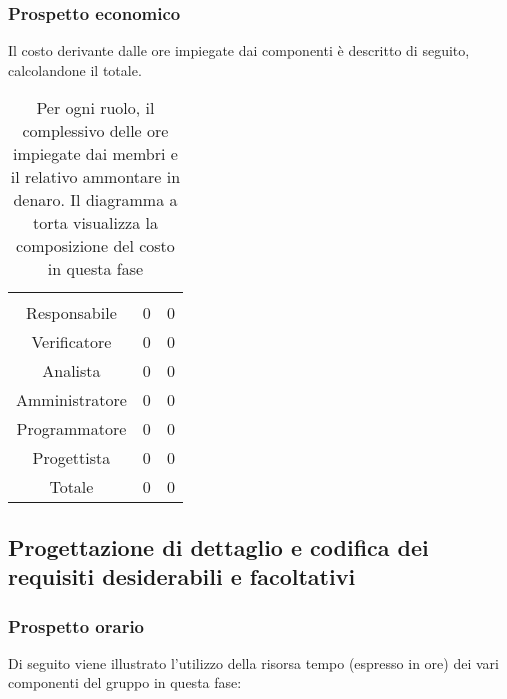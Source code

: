 \subsubsection{Prospetto economico}
Il costo derivante dalle ore impiegate dai componenti è descritto di seguito, calcolandone il totale.

\begin{table}[H]
{\setlength{\parindent}{0cm}
\begin{minipage}{.43\textwidth}
	\begin{tabular}{ccc}
	\rowcolorhead
	\headertitle{Ruolo} & \headertitle{Ore} & \headertitle{Costo(€)}\\
	Responsabile & 0 & 0\\
	Verificatore & 0 & 0\\
	Analista & 0 & 0\\
	Amministratore & 0 & 0\\
	Programmatore & 0 & 0\\
	Progettista & 0 & 0\\
	\hline
	Totale & 0& 0\\
	\end{tabular}
\end{minipage}%
\begin{minipage}{.57\textwidth}
\end{minipage} }
\caption{Per ogni ruolo, il complessivo delle ore impiegate dai membri e il relativo ammontare in denaro. Il diagramma a torta visualizza la composizione del costo in questa fase}
\end{table}




\subsection{Progettazione di dettaglio e codifica dei requisiti desiderabili e facoltativi}
\subsubsection{Prospetto orario}
Di seguito viene illustrato l'utilizzo della risorsa tempo (espresso in ore) dei vari componenti del gruppo in questa fase:

